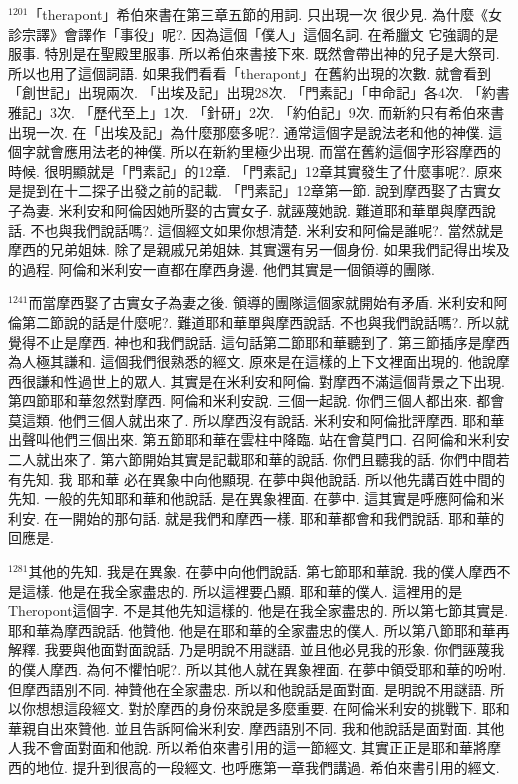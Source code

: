 \documentclass{book}
\begin{document}
$^{1201}$「therapont」希伯來書在第三章五節的用詞.
只出現一次 很少見.
為什麼《女診宗譯》會譯作「事役」呢?.
因為這個「僕人」這個名詞.
在希臘文 它強調的是服事.
特別是在聖殿里服事.
所以希伯來書接下來.
既然會帶出神的兒子是大祭司.
所以也用了這個詞語.
如果我們看看「therapont」在舊約出現的次數.
就會看到「創世記」出現兩次.
「出埃及記」出現28次.
「門素記」「申命記」各4次.
「約書雅記」3次.
「歷代至上」1次.
「針研」2次.
「約伯記」9次.
而新約只有希伯來書出現一次.
在「出埃及記」為什麼那麼多呢?.
通常這個字是說法老和他的神僕.
這個字就會應用法老的神僕.
所以在新約里極少出現.
而當在舊約這個字形容摩西的時候.
很明顯就是「門素記」的12章.
「門素記」12章其實發生了什麼事呢?.
原來是提到在十二探子出發之前的記載.
「門素記」12章第一節.
說到摩西娶了古實女子為妻.
米利安和阿倫因她所娶的古實女子.
就誣蔑她說.
難道耶和華單與摩西說話.
不也與我們說話嗎?.
這個經文如果你想清楚.
米利安和阿倫是誰呢?.
當然就是摩西的兄弟姐妹.
除了是親戚兄弟姐妹.
其實還有另一個身份.
如果我們記得出埃及的過程.
阿倫和米利安一直都在摩西身邊.
他們其實是一個領導的團隊.

$^{1241}$而當摩西娶了古實女子為妻之後.
領導的團隊這個家就開始有矛盾.
米利安和阿倫第二節說的話是什麼呢?.
難道耶和華單與摩西說話.
不也與我們說話嗎?.
所以就覺得不止是摩西.
神也和我們說話.
這句話第二節耶和華聽到了.
第三節插序是摩西為人極其謙和.
這個我們很熟悉的經文.
原來是在這樣的上下文裡面出現的.
他說摩西很謙和性過世上的眾人.
其實是在米利安和阿倫.
對摩西不滿這個背景之下出現.
第四節耶和華忽然對摩西.
阿倫和米利安說.
三個一起說.
你們三個人都出來.
都會莫這類.
他們三個人就出來了.
所以摩西沒有說話.
米利安和阿倫批評摩西.
耶和華出聲叫他們三個出來.
第五節耶和華在雲柱中降臨.
站在會莫門口.
召阿倫和米利安二人就出來了.
第六節開始其實是記載耶和華的說話.
你們且聽我的話.
你們中間若有先知.
我 耶和華 必在異象中向他顯現.
在夢中與他說話.
所以他先講百姓中間的先知.
一般的先知耶和華和他說話.
是在異象裡面.
在夢中.
這其實是呼應阿倫和米利安.
在一開始的那句話.
就是我們和摩西一樣.
耶和華都會和我們說話.
耶和華的回應是.

$^{1281}$其他的先知.
我是在異象.
在夢中向他們說話.
第七節耶和華說.
我的僕人摩西不是這樣.
他是在我全家盡忠的.
所以這裡要凸顯.
耶和華的僕人.
這裡用的是Theropont這個字.
不是其他先知這樣的.
他是在我全家盡忠的.
所以第七節其實是.
耶和華為摩西說話.
他贊他.
他是在耶和華的全家盡忠的僕人.
所以第八節耶和華再解釋.
我要與他面對面說話.
乃是明說不用謎語.
並且他必見我的形象.
你們誣蔑我的僕人摩西.
為何不懼怕呢?.
所以其他人就在異象裡面.
在夢中領受耶和華的吩咐.
但摩西語別不同.
神贊他在全家盡忠.
所以和他說話是面對面.
是明說不用謎語.
所以你想想這段經文.
對於摩西的身份來說是多麼重要.
在阿倫米利安的挑戰下.
耶和華親自出來贊他.
並且告訴阿倫米利安.
摩西語別不同.
我和他說話是面對面.
其他人我不會面對面和他說.
所以希伯來書引用的這一節經文.
其實正正是耶和華將摩西的地位.
提升到很高的一段經文.
也呼應第一章我們講過.
希伯來書引用的經文.
\end{document}

